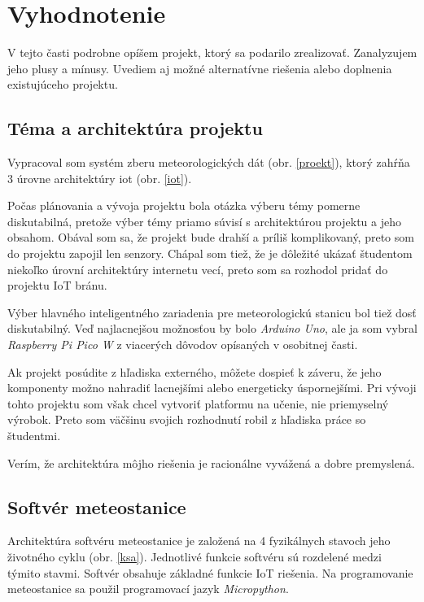 
\chapter{Vyhodnotenie}
\label{evaluation}

V tejto časti podrobne opíšem projekt, ktorý sa podarilo zrealizovať. Zanalyzujem jeho plusy a mínusy. Uvediem aj možné alternatívne riešenia alebo doplnenia existujúceho projektu.

\section{Téma a architektúra projektu}

Vypracoval som systém zberu meteorologických dát (obr. \ref{proekt}), ktorý zahŕňa 3 úrovne architektúry \gls{iot} (obr. \ref{iot}). 

Počas plánovania a vývoja projektu bola otázka výberu témy pomerne diskutabilná, pretože výber témy priamo súvisí s architektúrou projektu a jeho obsahom. Obával som sa, že projekt bude drahší a príliš komplikovaný, preto som do projektu zapojil len senzory. Chápal som tiež, že je dôležité ukázať študentom niekoľko úrovní architektúry internetu vecí, preto som sa rozhodol pridať do projektu IoT bránu. 

Výber hlavného inteligentného zariadenia pre meteorologickú stanicu bol tiež dosť diskutabilný. Veď najlacnejšou možnosťou by bolo \textit{Arduino Uno}, ale ja som vybral \textit{Raspberry Pi Pico W} z viacerých dôvodov opísaných v osobitnej časti. 

Ak projekt posúdite z hľadiska externého, môžete dospieť k záveru, že jeho komponenty možno nahradiť lacnejšími alebo energeticky úspornejšími. Pri vývoji tohto projektu som však chcel vytvoriť platformu na učenie, nie priemyselný výrobok. Preto som väčšinu svojich rozhodnutí robil z hľadiska práce so študentmi.

Verím, že architektúra môjho riešenia je racionálne vyvážená a dobre premyslená.

\section{Softvér meteostanice}
Architektúra softvéru meteostanice je založená na 4 fyzikálnych stavoch jeho životného cyklu (obr. \ref{ksa}). Jednotlivé funkcie softvéru sú rozdelené medzi týmito stavmi. Softvér obsahuje základné funkcie IoT riešenia. Na programovanie meteostanice sa použil programovací jazyk \textit{Micropython}. 


